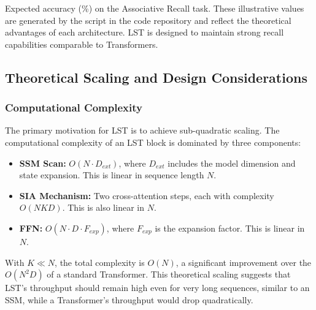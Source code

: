 \documentclass[10pt,twocolumn,letterpaper]{article}
\begin{document}
\begin{table}[t]
\centering
\small
{}
\caption{Expected accuracy (\%) on the Associative Recall task. These illustrative values are generated by the script in the code repository and reflect the theoretical advantages of each architecture. LST is designed to maintain strong recall capabilities comparable to Transformers.}
\label{tab:associative_recall}
\end{table}

\subsection{Theoretical Scaling and Design Considerations}

\subsubsection{Computational Complexity}
The primary motivation for LST is to achieve sub-quadratic scaling. The computational complexity of an LST block is dominated by three components:
\begin{itemize}
    \item \textbf{SSM Scan:} \(O(N \cdot D_{ext})\), where \(D_{ext}\) includes the model dimension and state expansion. This is linear in sequence length \(N\).
    \item \textbf{SIA Mechanism:} Two cross-attention steps, each with complexity \(O(NKD)\). This is also linear in \(N\).
    \item \textbf{FFN:} \(O(N \cdot D \cdot F_{exp})\), where \(F_{exp}\) is the expansion factor. This is linear in \(N\).
\end{itemize}
With \(K \ll N\), the total complexity is \(O(N)\), a significant improvement over the \(O(N^2 D)\) of a standard Transformer. This theoretical scaling suggests that LST's throughput should remain high even for very long sequences, similar to an SSM, while a Transformer's throughput would drop quadratically.
\end{document}
